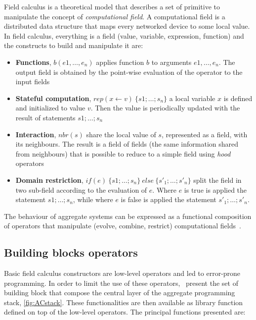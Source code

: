 Field calculus is a theoretical model that describes a set of primitive to manipulate the concept of \textit{computational field}. A computational field is a distributed data structure that maps every networked device to some local value. In field calculus, everything is a field (value, variable, expression, function) and the constructs to build and manipulate it are:
\begin{itemize}
    \item \textbf{Functions}, $b(e1,\dots,e_n)$ applies function $b$ to arguments $e1,\dots,e_n$. The output field is obtained by the point-wise evaluation of the operator to the input fields
    \item \textbf{Stateful computation}, $rep(x \leftarrow v)~\{s1; \dots ; s_n\}$ a local variable $x$ is defined and initialized to value $v$. Then the value is periodically updated with the result of statements $s1; \dots ; s_n$
    \item \textbf{Interaction}, $nbr(s)$ share the local value of $s$, represented as a field, with its neighbours. The result is a field of fields (the same information shared from neighbours) that is possible to reduce to a simple field using \textit{hood} operators
    \item \textbf{Domain restriction}, $if(e)~\{s1; \dots ; s_n\}~else~\{s'_1; \dots ; s'_n\}$ split the field in two sub-field according to the evaluation of $e$. Where $e$ is true is applied the statement $s1; \dots ; s_n$, while where $e$ is false is applied the statement $s'_1; \dots ; s'_n$.
\end{itemize}

The behaviour of aggregate systems can be expressed as a functional composition of operators that manipulate (evolve, combine, restrict) computational fields~\cite{type-sound}.

\subsection{Building blocks operators}
Basic field calculus constructors are low-level operators and led to error-prone programming. In order to limit the use of these  operators,~\cite{buildingBlock} present the set of building block that compose the central layer of the aggregate programming stack, \autoref{fig:ACstack}. These functionalities are then available as library function defined on top of the low-level operators. The principal functions presented are:

